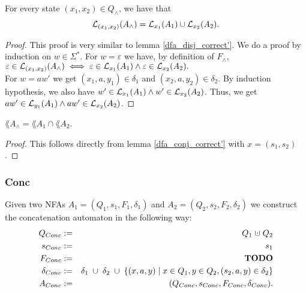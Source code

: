 \begin{lemma}
    \label{dfa_conj_correct'}
    For every state $(x_1, x_2) \in Q_\wedge$, we have that
    \begin{equation*}
        \mathcal{L}_{(x_1, x_2)}(A_\wedge) = \mathcal{L}_{x_1}(A_1) \cup \mathcal{L}_{x_2}(A_2).
    \end{equation*}
\end{lemma}
\begin{proof}
    This proof is very similar to lemma \ref{dfa_disj_correct'}.
    We do a proof by induction on $w \in \Sigma^*$.
    For $w = \varepsilon$ we have, by definition of $F_\wedge$, 
    $%
    \varepsilon \in \acc{(x_1, x_2)}{A_\wedge} 
    \iff \varepsilon \in \acc{x_1}{A_1} \wedge \varepsilon \in \acc{x_2}{A_2}.
    $%
    \\
    For $w = aw'$ we get $(x_1, a, y_1) \in \delta_1$ and $(x_2, a, y_2) \in \delta_2$.
    By induction hypothesis, we also have $w' \in \mathcal{L}_{x_1}(A_1) \wedge w' \in \mathcal{L}_{x_2}(A_2)$.
    Thus, we get $aw' \in \mathcal{L}_{y_1}(A_1) \wedge aw' \in \mathcal{L}_{x_2}(A_2)$.
\end{proof}

\begin{lemma}
    $\lang{A_\wedge} = \lang{A_1} \cap \lang{A_2}$.
    \label{dfa_conj_correct}
\end{lemma}
\begin{proof}
    This follows directly from lemma \ref{dfa_conj_correct'} with $x = (s_1, s_2)$.
\end{proof}




\subsubsection{Conc}
\begin{definition}
   Given two NFAs
    $A_1=(Q_1, s_1, F_1, \delta_1)$ and $A_2=(Q_2, s_2, F_2, \delta_2)$ 
    we construct the concatenation automaton in the following way:
    \begin{eqnarray*}
        Q_{Conc} &:=& Q_1 \; \dotcup \; Q_2 \\
        s_{Conc} &:=& s_1 \\
        F_{Conc} &:=&  \mathbf{TODO}\\
        \delta_{Conc} &:=& \delta_1 \; \cup \; \delta_2 \; \cup \; 
                         \{(x, a, y) \; | \; x \in Q_1, y \in Q_2, (s_2, a, y) \in \delta_2 \} \\
        A_{Conc} &:=& (Q_{Conc}, s_{Conc}, F_{Conc}, \delta_{Conc}).
    \end{eqnarray*}
\end{definition}

